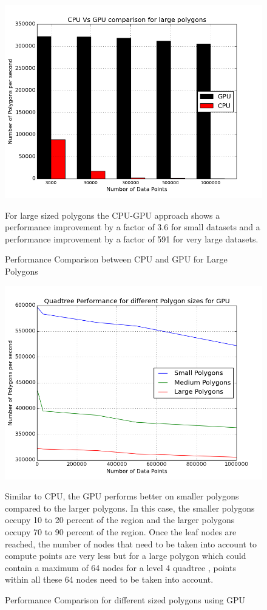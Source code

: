 \documentclass{article}
\begin{document}
\begin{figure}[ht]
\caption{Performance Comparison between CPU and GPU for Large Polygons}
\includegraphics[scale=0.5]{CPU_GPU_LargePoly3}

For large sized polygons the CPU-GPU approach shows a performance improvement by a factor of 3.6 for small datasets and a performance improvement by a factor of 591 for very large datasets.
\end{figure}

\begin{figure}[ht]
\caption{Performance Comparison for different sized polygons using GPU}
\includegraphics[scale=0.5]{Different_Sized_Polygon_GPU4}

Similar to CPU, the GPU performs better on smaller polygons compared to the larger polygons.
In this case, the smaller polygons occupy 10 to 20 percent of the region  and the larger polygons occupy 70 to 90 percent of the region. Once the leaf nodes are reached, the number of nodes that need to be taken into account to compute points are very less  but for a large polygon which could contain a maximum of 64 nodes for a level 4 quadtree , points within all these 64 nodes need to be taken into account. 

\end{figure}
\end{document}
